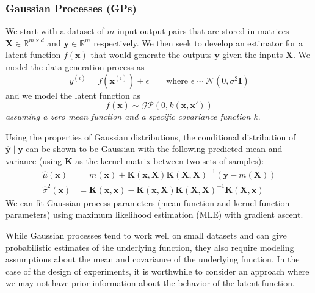 \documentclass[conference]{IEEEtran}
\begin{document}
	\subsubsection{Gaussian Processes (GPs)}

	We start with a dataset of $m$ input-output pairs that are stored in matrices $\mathbf{X} \in \mathbb{R}^{m \times d}$ and $\mathbf{y} \in \mathbb{R}^{m}$ respectively. We then seek to develop an estimator for a latent function $f(\mathbf{x})$ that would generate the outputs $\mathbf{y}$ given the inputs $\mathbf{X}$. We model the data generation process as
	\begin{equation}
	    y^{(i)} = f(\boldsymbol{x}^{(i)}) + \epsilon \qquad \text{where~}\epsilon \sim \mathcal{N}(0, \sigma^2 \boldsymbol{I})
	\end{equation}
	and we model the latent function as
	\begin{equation}
	    f(\boldsymbol{x}) \sim \mathcal{GP}(0, k(\boldsymbol{x}, \boldsymbol{x}'))
	\end{equation}
	\textit{assuming a zero mean function and a specific covariance function $k$}.
	
	Using the properties of Gaussian distributions, the conditional distribution of $\hat{\boldsymbol{y}} \mid \boldsymbol{y}$ can be shown to be Gaussian with the following predicted mean and variance (using $\boldsymbol{K}$ as the kernel matrix between two sets of samples):
	\begin{align}
	    \hat{\mu}(\boldsymbol{x}) &= m(\boldsymbol{x}) + \boldsymbol{K}(\boldsymbol{x}, \boldsymbol{X})\boldsymbol{K}(\boldsymbol{X}, \boldsymbol{X})^{-1}(\boldsymbol{y} - m(\boldsymbol{X})) \\
	    \hat{\sigma}^2(\boldsymbol{x}) &= \boldsymbol{K}(\boldsymbol{x}, \boldsymbol{x}) - \boldsymbol{K}(\boldsymbol{x}, \boldsymbol{X})\boldsymbol{K}(\boldsymbol{X}, \boldsymbol{X})^{-1}\boldsymbol{K}(\boldsymbol{X}, \boldsymbol{x})
	\end{align}
    We can fit Gaussian process parameters (mean function and kernel function parameters) using maximum likelihood estimation (MLE) with gradient ascent. 

    While Gaussian processes tend to work well on small datasets and can give probabilistic estimates of the underlying function, they also require modeling assumptions about the mean and covariance of the underlying function. In the case of the design of experiments, it is worthwhile to consider an approach where we may not have prior information about the behavior of the latent function.
    
\end{document}
